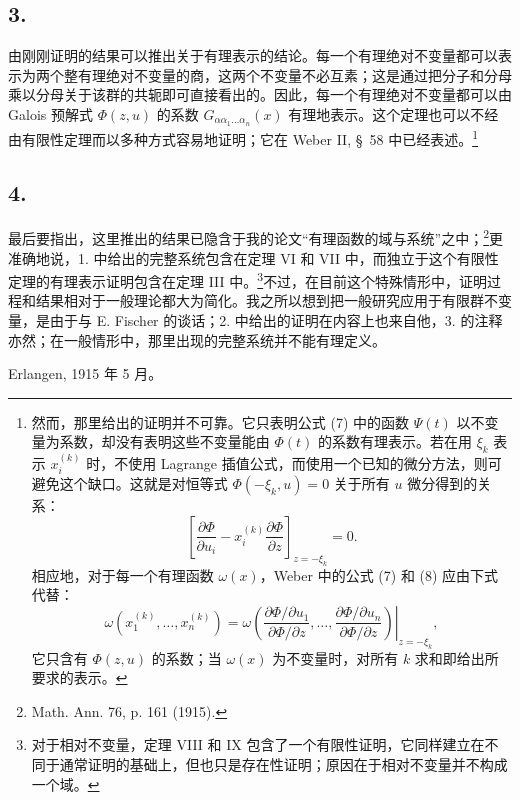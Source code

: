\subsection*{3.}
由刚刚证明的结果可以推出关于有理表示的结论。每一个有理绝对不变量都可以表示为两个整有理绝对不变量的商，这两个不变量不必互素；这是通过把分子和分母乘以分母关于该群的共轭即可直接看出的。因此，每一个有理绝对不变量都可以由 Galois 预解式 $\Phi(z,u)$ 的系数 $G_{\alpha\alpha_1\ldots\alpha_n}(x)$ 有理地表示。这个定理也可以不经由有限性定理而以多种方式容易地证明；它在 Weber II, \S\ 58 中已经表述。\footnote{然而，那里给出的证明并不可靠。它只表明公式 (7) 中的函数 $\Psi(t)$ 以不变量为系数，却没有表明这些不变量能由 $\Phi(t)$ 的系数有理表示。若在用 $\xi_k$ 表示 $x_i^{(k)}$ 时，不使用 Lagrange 插值公式，而使用一个已知的微分方法，则可避免这个缺口。这就是对恒等式 $\Phi(-\xi_k,u)=0$ 关于所有 $u$ 微分得到的关系：
\[
 \left[\frac{\partial\Phi}{\partial u_i}
      -x_i^{(k)}\frac{\partial\Phi}{\partial z}\right]_{z=-\xi_k}=0.
\]
相应地，对于每一个有理函数 $\omega(x)$，Weber 中的公式 (7) 和 (8) 应由下式代替：
\[
 \omega(x_1^{(k)},\ldots,x_n^{(k)})=
 \left.
 \omega\!\left(
   \frac{\partial\Phi/\partial u_1}{\partial\Phi/\partial z},\ldots,
   \frac{\partial\Phi/\partial u_n}{\partial\Phi/\partial z}
 \right)\right|_{z=-\xi_k},
\]
它只含有 $\Phi(z,u)$ 的系数；当 $\omega(x)$ 为不变量时，对所有 $k$ 求和即给出所要求的表示。}

\subsection*{4.}
最后要指出，这里推出的结果已隐含于我的论文“有理函数的域与系统”之中；\footnote{Math. Ann. 76, p. 161 (1915).}更准确地说，1. 中给出的完整系统包含在定理 VI 和 VII 中，而独立于这个有限性定理的有理表示证明包含在定理 III 中。\footnote{对于相对不变量，定理 VIII 和 IX 包含了一个有限性证明，它同样建立在不同于通常证明的基础上，但也只是存在性证明；原因在于相对不变量并不构成一个域。}不过，在目前这个特殊情形中，证明过程和结果相对于一般理论都大为简化。我之所以想到把一般研究应用于有限群不变量，是由于与 E. Fischer 的谈话；2. 中给出的证明在内容上也来自他，3. 的注释亦然；在一般情形中，那里出现的完整系统并不能有理定义。

Erlangen, 1915 年 5 月。

\clearpage
